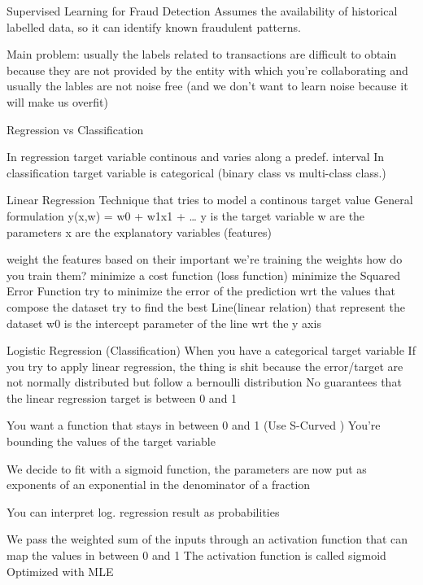 \iffalse
Supervised Learning for Fraud Detection
    Assumes the availability of historical labelled data, so it can identify known fraudulent patterns.

    Main problem: usually the labels related to transactions are difficult to obtain
        because they are not provided by the entity with which you're collaborating
        and usually the lables are not noise free (and we don't want to learn noise because it will make us overfit)

    Regression vs Classification 
    
    In regression target variable continous and varies along a predef. interval
    In classification target variable is categorical (binary class vs multi-class class.)

    Linear Regression 
        Technique that tries to model a continous target value
        General formulation 
        y(x,w) = w0 + w1x1 + \dots
        y is the target variable 
        w are the parameters 
        x are the explanatory variables (features)

        weight the features based on their important
        we're training the weights 
        how do you train them?
            minimize a cost function (loss function)
            minimize the Squared Error Function 
            try to minimize the error of the prediction wrt the values that compose the dataset
            try to find the best Line(linear relation) that represent the dataset
            w0 is the intercept parameter of the line wrt the y axis 

    Logistic Regression (Classification)
        When you have a categorical target variable 
        If you try to apply linear regression, the thing is shit because
        the error/target are not normally distributed but follow a bernoulli distribution
        No guarantees that the linear regression target is between 0 and 1

        You want a function that stays in between 0 and 1 (Use S-Curved )
        You're bounding the values of the target variable 

        We decide to fit with a sigmoid function, the parameters are now put as 
        exponents of an exponential in the denominator of a fraction 

        You can interpret log. regression result as probabilities 

        We pass the weighted sum of the inputs through an activation function that 
        can map the values in between 0 and 1 
        The activation function is called sigmoid 
        Optimized with MLE 

